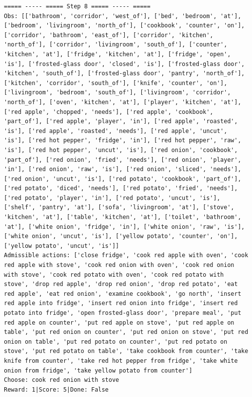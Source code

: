 \documentclass[11pt]{article}
\begin{document}
\begin{lstlisting}
===== ----- ===== Step 8 ===== ----- =====
Obs: [['bathroom', 'corridor', 'west_of'], ['bed', 'bedroom', 'at'], ['bedroom', 'livingroom', 'north_of'], ['cookbook', 'counter', 'on'], ['corridor', 'bathroom', 'east_of'], ['corridor', 'kitchen', 'north_of'], ['corridor', 'livingroom', 'south_of'], ['counter', 'kitchen', 'at'], ['fridge', 'kitchen', 'at'], ['fridge', 'open', 'is'], ['frosted-glass door', 'closed', 'is'], ['frosted-glass door', 'kitchen', 'south_of'], ['frosted-glass door', 'pantry', 'north_of'], ['kitchen', 'corridor', 'south_of'], ['knife', 'counter', 'on'], ['livingroom', 'bedroom', 'south_of'], ['livingroom', 'corridor', 'north_of'], ['oven', 'kitchen', 'at'], ['player', 'kitchen', 'at'], ['red apple', 'chopped', 'needs'], ['red apple', 'cookbook', 'part_of'], ['red apple', 'player', 'in'], ['red apple', 'roasted', 'is'], ['red apple', 'roasted', 'needs'], ['red apple', 'uncut', 'is'], ['red hot pepper', 'fridge', 'in'], ['red hot pepper', 'raw', 'is'], ['red hot pepper', 'uncut', 'is'], ['red onion', 'cookbook', 'part_of'], ['red onion', 'fried', 'needs'], ['red onion', 'player', 'in'], ['red onion', 'raw', 'is'], ['red onion', 'sliced', 'needs'], ['red onion', 'uncut', 'is'], ['red potato', 'cookbook', 'part_of'], ['red potato', 'diced', 'needs'], ['red potato', 'fried', 'needs'], ['red potato', 'player', 'in'], ['red potato', 'uncut', 'is'], ['shelf', 'pantry', 'at'], ['sofa', 'livingroom', 'at'], ['stove', 'kitchen', 'at'], ['table', 'kitchen', 'at'], ['toilet', 'bathroom', 'at'], ['white onion', 'fridge', 'in'], ['white onion', 'raw', 'is'], ['white onion', 'uncut', 'is'], ['yellow potato', 'counter', 'on'], ['yellow potato', 'uncut', 'is']]
Admissible actions: ['close fridge', 'cook red apple with oven', 'cook red apple with stove', 'cook red onion with oven', 'cook red onion with stove', 'cook red potato with oven', 'cook red potato with stove', 'drop red apple', 'drop red onion', 'drop red potato', 'eat red apple', 'eat red onion', 'examine cookbook', 'go north', 'insert red apple into fridge', 'insert red onion into fridge', 'insert red potato into fridge', 'open frosted-glass door', 'prepare meal', 'put red apple on counter', 'put red apple on stove', 'put red apple on table', 'put red onion on counter', 'put red onion on stove', 'put red onion on table', 'put red potato on counter', 'put red potato on stove', 'put red potato on table', 'take cookbook from counter', 'take knife from counter', 'take red hot pepper from fridge', 'take white onion from fridge', 'take yellow potato from counter']
Choose: cook red onion with stove
Reward: 1|Score: 5|Done: False


\end{lstlisting}
\end{document}
